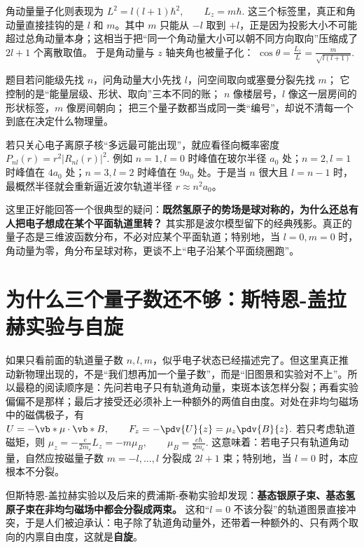 \documentclass[lang=cn,11pt]{elegantbook}
\begin{document}
角动量量子化则表现为
 \(L^2=l(l+1)\hbar^2, \qquad L_z=m\hbar.\) 
这三个标签里，真正和角动量直接挂钩的是 \(l\) 和 \(m\)。其中 \(m\) 只能从 \(-l\) 取到 \(+l\)，正是因为投影大小不可能超过总角动量本身；这相当于把“同一个角动量大小可以朝不同方向取向”压缩成了 \(2l+1\) 个离散取值。
于是角动量与 \(z\) 轴夹角也被量子化：
 \(\cos\theta=\frac{L_z}{L}=\frac{m}{\sqrt{l(l+1)}}.\) 

\begin{note}
 题目若问能级先找 \(n\)，问角动量大小先找 \(l\)，问空间取向或塞曼分裂先找 \(m\)； 它控制的是“能量层级、形状、取向”三本不同的账； \(n\) 像楼层号，\(l\) 像这一层房间的形状标签，\(m\) 像房间朝向； 把三个量子数都当成同一类“编号”，却说不清每一个到底在决定什么物理量。
\end{note}

若只关心电子离原子核“多远最可能出现”，就应看径向概率密度
 \(P_{nl}(r)=r^2|R_{nl}(r)|^2.\) 
例如 \(n=1,l=0\) 时峰值在玻尔半径 \(a_0\) 处；\(n=2,l=1\) 时峰值在 \(4a_0\) 处；\(n=3,l=2\) 时峰值在 \(9a_0\) 处。于是当 \(n\) 很大且 \(l=n-1\) 时，最概然半径就会重新逼近波尔轨道半径 \(r\approx n^2a_0\)。

\begin{remark}
这里正好能回答一个很典型的疑问：\textbf{既然氢原子的势场是球对称的，为什么还总有人把电子想成在某个平面轨道里转？} 其实那是波尔模型留下的经典残影。真正的量子态是三维波函数分布，不必对应某个平面轨道；特别地，当 \(l=0,m=0\) 时，角动量为零，角分布呈球对称，更谈不上“电子沿某个平面绕圈跑”。
\end{remark}

\section{为什么三个量子数还不够：斯特恩-盖拉赫实验与自旋}

如果只看前面的轨道量子数 \(n,l,m\)，似乎电子状态已经描述完了。但这里真正推动新物理出现的，不是“我们想再加一个量子数”，而是“旧图景和实验对不上”。所以最稳的阅读顺序是：先问若电子只有轨道角动量，束斑本该怎样分裂；再看实验偏偏不是那样；最后才接受还必须补上一种额外的两值自由度。对处在非均匀磁场中的磁偶极子，有
 \(U=-\vb*{\mu}\cdot \vb*{B}, \qquad F_z=-\pdv{U}{z}=\mu_z\pdv{B}{z}.\) 
若只考虑轨道磁矩，则
 \(\mu_z=-\frac{e}{2m_e}L_z=-m\mu_B, \qquad \mu_B=\frac{e\hbar}{2m_e}.\) 
这意味着：若电子只有轨道角动量，自然应按磁量子数 \(m=-l,\dots,l\) 分裂成 \(2l+1\) 束；特别地，当 \(l=0\) 时，本应根本不分裂。

但斯特恩-盖拉赫实验以及后来的费浦斯-泰勒实验却发现：\textbf{基态银原子束、基态氢原子束在非均匀磁场中都会分裂成两束。} 这和“\(l=0\) 不该分裂”的轨道图景直接冲突，于是人们被迫承认：电子除了轨道角动量外，还带着一种额外的、只有两个取向的内禀自由度，这就是\textbf{自旋}。
\end{document}
